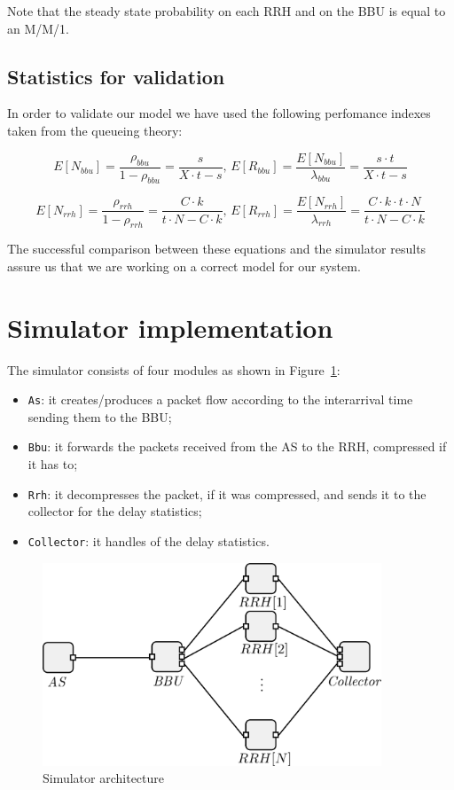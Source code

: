 \documentclass[11pt,a4paper,oneside, openright]{article}
\begin{document}
Note that the steady state probability on each RRH and on the BBU is equal to an M/M/1.

\subsection{Statistics for validation}
In order to validate our model we have used the following perfomance indexes taken from the queueing theory:

$$ E[N_{bbu}] = \frac{\rho_{bbu}}{1 - \rho_{bbu}} = \frac{s}{X \cdot t - s} \text{, } E[R_{bbu}] = \frac{E[N_{bbu}]}{\lambda_{bbu}} =  \frac{s \cdot t}{X \cdot t - s}$$

$$ E[N_{rrh}] = \frac{\rho_{rrh}}{1 - \rho_{rrh}} = \frac{C \cdot k}{t \cdot N - C \cdot k} \text{, } E[R_{rrh}] = \frac{E[N_{rrh}]}{\lambda_{rrh}} = \frac{C \cdot k \cdot t \cdot N}{t \cdot N - C \cdot k}$$

The successful comparison between these equations and the simulator results assure us that we are working on a correct model for our system.

\section{Simulator implementation}
The simulator consists of four modules as shown in Figure~\ref{fig:simulator}:
\begin{itemize}
  \item \texttt{As}: it creates/produces a packet flow according to the interarrival time sending them to the BBU;
  \item \texttt{Bbu}: it forwards the packets received from the AS to the RRH, compressed if it has to;
  \item \texttt{Rrh}: it decompresses the packet, if it was compressed, and sends it to the collector for the delay statistics;
  \item \texttt{Collector}: it handles of the delay statistics.
\end{itemize}

\begin{figure}[h]
    \centering
    \includegraphics[width=0.9\textwidth]{images/simulator}
    \caption{Simulator architecture}
    \label{fig:simulator}
\end{figure}
\end{document}

